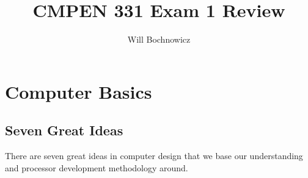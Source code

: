 \documentclass{article}
\title{CMPEN 331 Exam 1 Review}
\author{Will Bochnowicz}
\begin{document}
\maketitle

\tableofcontents

\section{Computer Basics}

\subsection{Seven Great Ideas}

There are seven great ideas in computer design that we base our understanding and processor development methodology around. 
\end{document}
